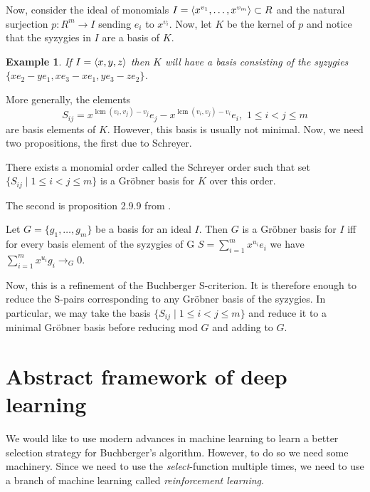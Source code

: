 \documentclass{article}
\theoremstyle{changedot}
\theoremstyle{changedotbreak}
\theoremstyle{nonumberplain}
\newtheorem{example}{Example}
\DeclarePairedDelimiter{\tuple}{\langle}{\rangle}
\DeclareMathOperator{\lcm}{lcm}
\begin{document}
Now, consider the ideal of monomials $I = \tuple{x^{v_{1}}, \dots, x^{v_{m}}} \subset R$ and the natural surjection $p : R^{m} \to I$ sending $e_{i}$ to $x^{v_{i}}$. Now, let $K$ be the kernel of $p$ and notice that the syzygies in $I$ are a basis of $K$.

\begin{example}
If $I = \tuple{x, y, z}$ then $K$ will have a basis consisting of the syzygies $\{x e_{2} - y e_{1}, x e_{3} - x e_{1}, y e_{3} - z e_{2}\}$.
\end{example}

More generally, the elements \[S_{ij} = x^{\lcm(v_{i}, v_{j}) - v_{j}} e_{j} - x^{\lcm(v_{i}, v_{j}) - v_{i}} e_{i}, \, \, 1 \leq i < j \leq m\] are basis elements of $K$. However, this basis is usually not minimal. Now, we need two propositions, the first due to Schreyer.

\begin{theorem}
 There exists a monomial order called the Schreyer order such that set $\{S_{ij} \mid 1 \leq i < j \leq m\}$ is a Gröbner basis for $K$ over this order.
\end{theorem}

The second is proposition 2.9.9 from \cite{IVA}.

\begin{theorem}
  Let $G = \{g_{1}, \dots, g_{m}\}$ be a basis for an ideal $I$. Then $G$ is a Gröbner basis for $I$ iff for every basis element of the syzygies of G $S = \sum_{i = 1}^{m} x^{u_{i}} e_{i}$ we have $\sum_{i=1}^{m} x^{u_{i}} g_{i} \to_{G} 0$.
\end{theorem}

Now, this is a refinement of the Buchberger S-criterion. It is therefore enough to reduce the S-pairs corresponding to any Gröbner basis of the syzygies. In particular, we may take the basis $\{S_{ij} \mid 1 \leq i < j \leq m\}$ and reduce it to a minimal Gröbner basis before reducing mod $G$ and adding to $G$.


\section{Abstract framework of deep learning}

We would like to use modern advances in machine learning to learn a better selection strategy for Buchberger's algorithm. However, to do so we need some machinery. Since we need to use the \emph{select}-function multiple times, we need to use a branch of machine learning called \emph{reinforcement learning}.
\end{document}
